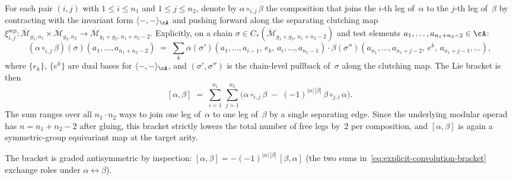 \begin{construction}
For each pair $(i,j)$ with $1 \leq i \leq n_1$ and
$1 \leq j \leq n_2$, denote by $\alpha \circ_{i,j} \beta$ the
composition that joins the $i$-th leg of~$\alpha$ to the $j$-th
leg of~$\beta$ by contracting with the invariant form
$\langle -, - \rangle_{\cA}$ and pushing forward along the
separating clutching map
$\xi_{i,j}^{\mathrm{sep}} \colon
\overline{\mathcal{M}}_{g_1,n_1} \times
\overline{\mathcal{M}}_{g_2,n_2}
\to
\overline{\mathcal{M}}_{g_1+g_2,\, n_1+n_2-2}$.
Explicitly, on a chain
$\sigma \in C_*(\overline{\mathcal{M}}_{g_1+g_2,\,n_1+n_2-2})$
and test elements $a_1, \ldots, a_{n_1+n_2-2} \in \cA$:
\begin{equation}
\label{eq:single-edge-composition}
(\alpha \circ_{i,j} \beta)(\sigma)(a_1,\ldots,a_{n_1+n_2-2})
\;=\;
\sum_k
\alpha(\sigma')
  (a_1,\ldots,a_{i-1},\, e_k,\, a_{i},\ldots,a_{n_1-1})
\cdot
\beta(\sigma'')
  (a_{n_1},\ldots,a_{n_1+j-2},\, e^k,\, a_{n_1+j-1},\ldots),
\end{equation}
where $\{e_k\}$, $\{e^k\}$ are dual bases for
$\langle -, - \rangle_{\cA}$, and $(\sigma', \sigma'')$ is the
chain-level pullback of~$\sigma$ along the clutching map.
The Lie bracket is then
\begin{equation}
\label{eq:explicit-convolution-bracket}
[\alpha,\beta]
\;=\;
\sum_{i=1}^{n_1}\, \sum_{j=1}^{n_2}
\bigl(
\alpha \circ_{i,j} \beta
\;-\;
(-1)^{|\alpha|\,|\beta|}
\,\beta \circ_{j,i} \alpha
\bigr).
\end{equation}
The sum ranges over all $n_1 \cdot n_2$ ways to join one leg
of~$\alpha$ to one leg of~$\beta$ by a single separating edge.
Since the underlying modular operad has $n = n_1 + n_2 - 2$ after
gluing, this bracket strictly lowers the total number of free legs
by~$2$ per composition, and $[\alpha,\beta]$ is again a symmetric-group
equivariant map at the target arity.

The bracket is graded antisymmetric by inspection:
$[\alpha,\beta] = -(-1)^{|\alpha|\,|\beta|}\,[\beta,\alpha]$
(the two sums in~\eqref{eq:explicit-convolution-bracket}
exchange roles under $\alpha \leftrightarrow \beta$).
\end{construction}

